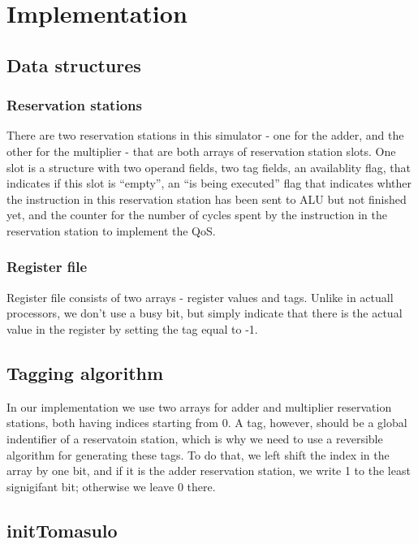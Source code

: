\section{Implementation}

\subsection{Data structures}

\subsubsection{Reservation stations}

There are two reservation stations in this simulator - one for the adder, and the other for the multiplier - that are both arrays of reservation station slots. One slot is a structure with two operand fields, two tag fields, an availablity flag, that indicates if this slot is ``empty'', an ``is being executed'' flag that indicates whther the instruction in this reservation station has been sent to ALU but not finished yet, and the counter for the number of cycles spent by the instruction in the reservation station to implement the QoS.

\subsubsection{Register file}
Register file consists of two arrays - register values and tags. Unlike in actuall processors, we don't use a busy bit, but simply indicate that there is the actual value in the register by setting the tag equal to -1.

\subsection{Tagging algorithm}

In our implementation we use two arrays for adder and multiplier reservation stations, both having indices starting from 0. A tag, however, should be a global indentifier of a reservatoin station, which is why we need to use a reversible algorithm for generating these tags. To do that, we left shift the index in the array by one bit, and if it is the adder reservation station, we write 1 to the least signigifant bit; otherwise we leave 0 there.

\subsection{initTomasulo}

